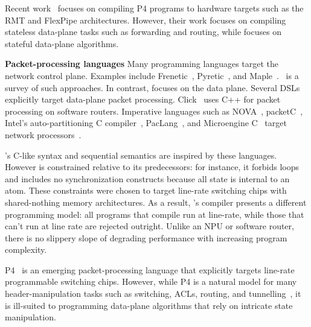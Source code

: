 Recent work~\cite{lavanya_compiler} focuses on compiling P4 programs to
hardware targets such as the RMT and FlexPipe architectures. However, their
work focuses on compiling stateless data-plane tasks such as forwarding and
routing, while \pktlanguage focuses on stateful data-plane algorithms.

\textbf{Packet-processing languages}
Many programming languages target the network control plane. Examples include
Frenetic~\cite{frenetic}, Pyretic~\cite{pyretic}, and
Maple~\cite{maple}.~\cite{language_survey} is a survey of such approaches.  In
contrast, \pktlanguage focuses on the data plane. Several DSLs explicitly
target data-plane packet processing. Click~\cite{click} uses C++ for packet
processing on software routers. Imperative languages such as NOVA~\cite{nova},
packetC~\cite{packetc}, Intel's auto-partitioning C
compiler~\cite{intel_uiuc_pldi}, PacLang~\cite{paclang_lang,
paclang_partitioner}, and Microengine C~\cite{microenginec, intel_ixa} target
network processors~\cite{ixp2800, ixp4xx}.

\pktlanguage's C-like syntax and sequential semantics are inspired by these
languages. However \pktlanguage is constrained relative to its predecessors:
for instance, it forbids loops and includes no synchronization constructs
because all state is internal to an atom. These constraints were chosen to
target line-rate switching chips with shared-nothing memory architectures. As a
result, \pktlanguage's compiler presents a different programming model: all
\pktlanguage programs that compile run at line-rate, while those that can't run
at line rate are rejected outright. Unlike an NPU or software router, there is
no slippery slope of degrading performance with increasing program complexity.

P4~\cite{p4} is an emerging packet-processing language that explicitly targets
line-rate programmable switching chips. However, while P4 is a natural model
for many header-manipulation tasks such as switching, ACLs, routing, and
tunnelling~\cite{dc_p4}, it is ill-suited to programming data-plane algorithms that
rely on intricate state manipulation.


